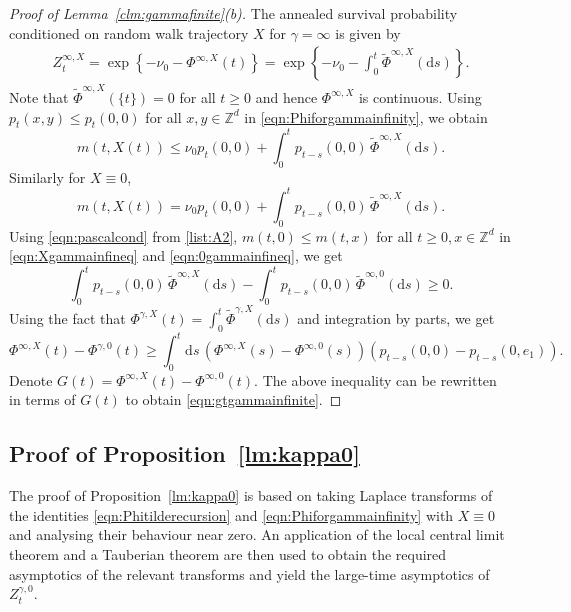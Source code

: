 \documentclass{article}[12pt]
\theoremstyle{definition}
\newcommand{\Z}{\mathbb{Z}}
\newcommand{\1}{\mathbbm{1}}
\newcommand{\dd }{\mathrm{d} }
\begin{document}
\begin{proof}[Proof of Lemma~\ref{clm:gammafinite}(b)]
 The annealed survival probability conditioned on random walk trajectory $X$ for $\gamma=\infty$ is given by 
\begin{equation}
    \begin{split}
        Z^{\infty, X}_t = \exp\left\{-\nu_0-\Phi^{\infty, X}(t)\right\}=\exp\left\{-\nu_0 - \int_0^t\tilde{\Phi}^{\infty, X}( \dd s) \right\}.
    \end{split}
\end{equation}
Note that $\tilde{\Phi}^{\infty, X}(\{t\}) = 0$ for all $t\ge 0$ and hence $\Phi^{\infty, X}$ is continuous.  Using $p_t(x,y)\le p_t(0,0)$ for all $x,y\in\Z^d$ in \eqref{eqn:Phiforgammainfinity}, we obtain 
\begin{equation}
    m(t,X(t)) \le \nu_0 p_{t}(0,0)+  \int_{0}^t p_{t-s}(0,0)\, \tilde{\Phi}^{\infty, X}(\dd s).
    \label{eqn:Xgammainfineq}
\end{equation}
 Similarly for $X\equiv 0$,
 \begin{equation}
     m(t,X(t)) = \nu_0 p_{t}(0,0)+  \int_{0}^t p_{t-s}(0,0)\, \tilde{\Phi}^{\infty, X}(\dd s).
     \label{eqn:0gammainfineq}
 \end{equation}
Using \eqref{eqn:pascalcond} from \ref{list:A2}, $ m(t, 0) \le  m(t, x)$ for all $t\ge 0, x\in \Z^d$ in \eqref{eqn:Xgammainfineq} and \eqref{eqn:0gammainfineq}, we get
$$\int_0^t p_{t-s}(0,0) \,\tilde{\Phi}^{\infty, X}(\dd s) -\int_0^t p_{t-s}(0,0) \,\tilde{\Phi}^{\infty, 0}(\dd s) \ge 0.$$
Using the fact that $\Phi^{\gamma, X}(t) = \int_0^t \tilde{\Phi}^{\gamma, X}(\dd s)$ and integration by parts, we get
$${\Phi}^{\infty, X}(t)-{\Phi}^{\gamma, 0}(t)\ge   \int_0^t \dd s\, \left({\Phi}^{\infty, X}(s)-{\Phi}^{\infty, 0}(s)\right)\left(p_{t-s}(0,0)- p_{t-s}(0, e_1)\right). $$
Denote $G(t) = {\Phi}^{\infty, X}(t)-{\Phi}^{\infty, 0}(t)$. The above inequality can be rewritten in terms of $G(t)$ to obtain \eqref{eqn:gtgammainfinite}.
\end{proof}



\subsection{Proof of Proposition~\ref{lm:kappa0}}
The proof of Proposition~\ref{lm:kappa0} is based on taking Laplace transforms of the identities \eqref{eqn:Phitilderecursion} and \eqref{eqn:Phiforgammainfinity} with $X\equiv 0$ and analysing their behaviour near zero. An application of the local central limit theorem and a Tauberian theorem are then used to obtain the required asymptotics of the relevant transforms and yield the large-time asymptotics of $Z^{\gamma, 0}_t$.
\end{document}
